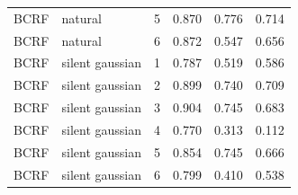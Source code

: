 \begin{tabular}{lllccc}
BCRF & natural & 5 & 0.870 & 0.776 & 0.714 \\
BCRF & natural & 6 & 0.872 & 0.547 & 0.656 \\
BCRF & silent gaussian & 1 & 0.787 & 0.519 & 0.586 \\
BCRF & silent gaussian & 2 & 0.899 & 0.740 & 0.709 \\
BCRF & silent gaussian & 3 & 0.904 & 0.745 & 0.683 \\
BCRF & silent gaussian & 4 & 0.770 & 0.313 & 0.112 \\
BCRF & silent gaussian & 5 & 0.854 & 0.745 & 0.666 \\
BCRF & silent gaussian & 6 & 0.799 & 0.410 & 0.538 \\
\bottomrule
\end{tabular}
